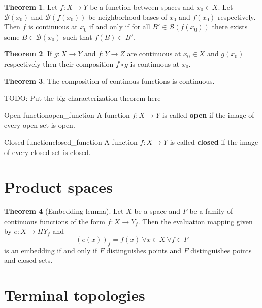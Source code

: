\documentclass[a4paper]{book}
\theoremstyle{definition}
\newtheorem{theorem}{Theorem}[section]
\theoremstyle{ejemplo}
\theoremstyle{demostracion}
\begin{document}
\begin{theorem}
	Let $f: X \rightarrow Y$ be a function between spaces and $x_0 \in X$. Let $\mathcal{B}(x_0)$ and $\mathcal{B}(f(x_0))$ be neighborhood bases of $x_0$ and $f(x_0)$ respectively. Then $f$ is continuous at $x_0$ if and only if for all $B' \in \mathcal{B}(f(x_0))$ there exists some $B \in \mathcal{B}(x_0)$ such that $f(B) \subset B'$.
\end{theorem}

\begin{theorem}
	If $g: X \rightarrow Y$ and $f: Y \rightarrow Z$ are continuous at $x_0 \in X$ and $g(x_0)$ respectively then their composition $f \circ g$ is continuous at $x_0$.
\end{theorem}
\begin{theorem}
	The composition of continous functions is continuous.
\end{theorem}

TODO: Put the big characterization theorem here

\begin{define}{Open function}{open_function}
	A function $f: X \rightarrow Y$ is called \textbf{open} if the image of every open set is open.
\end{define}

\begin{define}{Closed function}{closed_function}
	A function $f: X \rightarrow Y$ is called \textbf{closed} if the image of every closed set is closed.
\end{define}

\section{Product spaces}
\begin{theorem}[Embedding lemma]
	Let $X$ be a space and $F$ be a family of continuous functions of the form $f: X \rightarrow Y_f$. Then the evaluation mapping given by $e:X \rightarrow \Pi Y_f$ and
	\begin{equation*}
		(e(x))_f = f(x)\ \forall x \in X\ \forall f \in F	
	\end{equation*}
	is an embedding if and only if $F$ distinguishes points and $F$ distinguishes points and closed sets.
\end{theorem}

\section{Terminal topologies}
\end{document}
